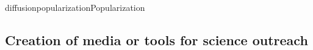 \documentclass{ra2018}
\begin{document}
\begin{module}{diffusion}{popularization}{Popularization}
\subsection{Creation of media or tools for science outreach}

\end{module}




\end{document}
